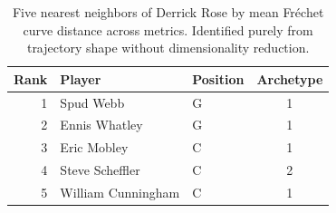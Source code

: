 \begin{table}[htbp]
  \centering\small
  \begin{tabular}{rllc}
    \toprule
    Rank & Player & Position & Archetype \\
    \midrule
    1 & Spud Webb & G & 1 \\
    2 & Ennis Whatley & G & 1 \\
    3 & Eric Mobley & C & 1 \\
    4 & Steve Scheffler & C & 2 \\
    5 & William Cunningham & C & 1 \\
    \bottomrule
  \end{tabular}
  \caption{Five nearest neighbors of Derrick Rose by mean Fr\'{e}chet curve distance across metrics. Identified purely from trajectory shape without dimensionality reduction.}
  \label{tab:Derrick_Rose_frechet_curve_neighbors}
\end{table}

